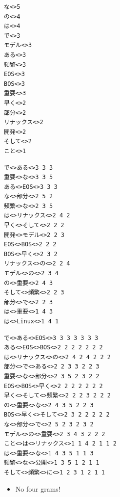 \documentclass[a4paper,landscape,headrule,footrule,xetex]{foils}
\begin{document}
\begin{small}
   \makexeCJKactive
\begin{verbatim}
な<>5 
の<>4 
は<>4 
で<>3 
モデル<>3 
ある<>3 
頻繁<>3 
EOS<>3 
BOS<>3 
重要<>3 
早く<>2 
部分<>2 
リナックス<>2 
開発<>2 
そして<>2 
こと<>1 
\end{verbatim} \makexeCJKinactive
   
\end{small}


\begin{small} \makexeCJKactive
\begin{verbatim}
で<>ある<>3 3 3 
重要<>な<>3 3 5 
ある<>EOS<>3 3 3 
な<>部分<>2 5 2 
頻繁<>な<>2 3 5  
は<>リナックス<>2 4 2 
早く<>そして<>2 2 2 
開発<>モデル<>2 2 3 
EOS<>BOS<>2 2 2 
BOS<>早く<>2 3 2 
リナックス<>の<>2 2 4 
モデル<>の<>2 3 4 
の<>重要<>2 4 3 
そして<>頻繁<>2 2 3 
部分<>で<>2 2 3 
は<>重要<>1 4 3 
は<>Linux<>1 4 1 
\end{verbatim} \makexeCJKinactive
\end{small}

\begin{small} \makexeCJKactive
\begin{verbatim}
で<>ある<>EOS<>3 3 3 3 3 3 3 
ある<>EOS<>BOS<>2 2 2 2 2 2 2 
は<>リナックス<>の<>2 4 2 4 2 2 2 
部分<>で<>ある<>2 2 3 3 2 2 3 
重要<>な<>部分<>2 3 5 2 3 2 2 
EOS<>BOS<>早く<>2 2 2 2 2 2 2 
早く<>そして<>頻繁<>2 2 2 3 2 2 2 
の<>重要<>な<>2 4 3 5 2 2 3 
BOS<>早く<>そして<>2 3 2 2 2 2 2 
な<>部分<>で<>2 5 2 3 2 3 2 
モデル<>の<>重要<>2 3 4 3 2 2 2 
こと<>は<>リナックス<>1 1 4 2 1 1 2 
は<>重要<>な<>1 4 3 5 1 1 3 
頻繁<>な<>公開<>1 3 5 1 2 1 1 
そして<>頻繁<>に<>1 2 3 1 2 1 1 
\end{verbatim} \makexeCJKinactive
\end{small} 


\begin{itemize}
\item No four grams!
\end{itemize}


\end{document}
